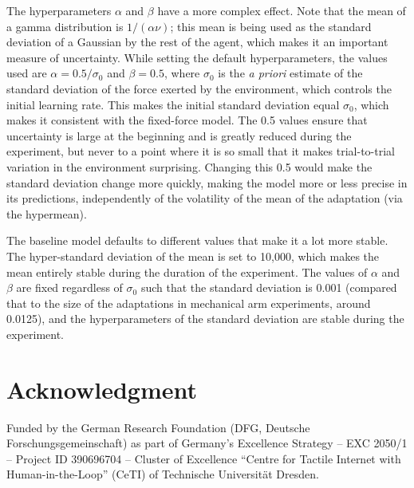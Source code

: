 \documentclass[a4paper,doc,floatsintext,natbib]{apa6}
\begin{document}
The hyperparameters $\alpha$ and $\beta$ have a more complex effect. Note that
the mean of a gamma distribution is $1 / (\alpha \nu)$; this mean is being used
as the standard deviation of a Gaussian by the rest of the agent, which makes it
an important measure of uncertainty. While setting the default hyperparameters,
the values used are $\alpha = 0.5 / \sigma_0$ and $\beta = 0.5$, where
$\sigma_0$ is the \textit{a priori} estimate of the standard deviation of the
force exerted by the environment, which controls the initial learning rate. This
makes the initial standard deviation equal $\sigma_0$, which makes it consistent
with the fixed-force model. The 0.5 values ensure that uncertainty is large at
the beginning and is greatly reduced during the experiment, but never to a point
where it is so small that it makes trial-to-trial variation in the environment
surprising. Changing this 0.5 would make the standard deviation change more
quickly, making the model more or less precise in its predictions, independently
of the volatility of the mean of the adaptation (via the hypermean).

The baseline model defaults to different values that make it a lot more
stable. The hyper-standard deviation of the mean is set to 10,000, which makes
the mean entirely stable during the duration of the experiment. The values of
$\alpha$ and $\beta$ are fixed regardless of $\sigma_0$ such that the standard
deviation is 0.001 (compared that to the size of the adaptations in mechanical
arm experiments, around 0.0125), and the hyperparameters of the standard
deviation are stable during the experiment.


\section{Acknowledgment}
Funded by the German Research Foundation (DFG, Deutsche Forschungsgemeinschaft) as part of Germany’s Excellence Strategy – EXC 2050/1 – Project ID 390696704 – Cluster of Excellence “Centre for Tactile Internet with Human-in-the-Loop” (CeTI) of Technische Universität Dresden.


\end{document}
